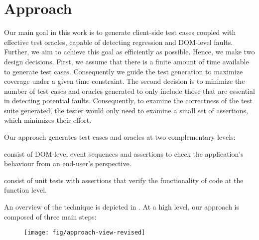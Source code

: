 \section{Approach} \label{Sec:approach}
Our main goal in this work is to generate client-side test cases coupled with
effective test oracles, capable of detecting regression \javascript and DOM-level faults. 
Further, we aim to achieve this goal as efficiently as possible. Hence, we make two design decisions. First, we assume that there is a finite amount of time available to generate test cases. Consequently we guide the test generation  to maximize coverage under a given time constraint. 
The second decision is to minimize the number of test cases and oracles generated to only include those that are essential in detecting potential faults. %
Consequently, to examine the correctness of the test suite generated, the tester would only need to examine a small set of assertions, which minimizes their effort.

Our approach generates test cases and oracles at two complementary levels:
\begin{description}
\item[DOM-level event-based tests] consist of DOM-level event sequences and assertions to check the application's behaviour from an end-user's perspective. 
\item[Function-level unit tests]  consist of unit tests with assertions that verify the functionality of \javascript code at the function level.
\end{description}

An overview of the technique is depicted in . 
At a high level, our approach is composed of three main steps:

\begin{figure}[!t]
  \centering
  \texttt{[image: fig/approach-view-revised]}
  \vspace{-0.1in} 
  \label{Fig:approach-view}
  \vspace{-0.1in} 
\end{figure}


